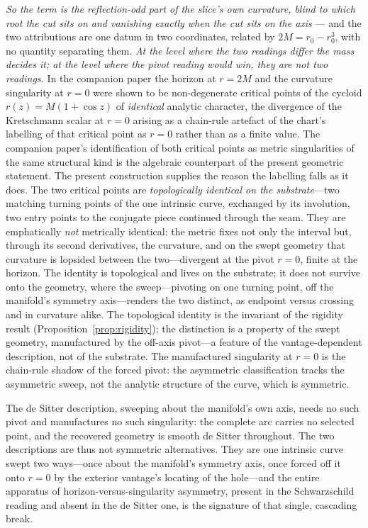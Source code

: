 \documentclass[11pt,a4paper]{article}
\theoremstyle{definition}
\begin{document}
\emph{So the term is the reflection-odd part of the slice's own curvature, blind to which root the cut sits
on and vanishing exactly when the cut sits on the axis} --- and the two attributions are one datum in two
coordinates, related by $2M=r_0-r_0^{3}$, with no quantity separating them. \emph{At the level where the two
readings differ the mass decides it; at the level where the pivot reading would win, they are not two
readings.} In the companion paper the horizon at $r=2M$ and the curvature singularity at $r=0$ were shown to be non-degenerate critical points of the cycloid $r(z)=M(1+\cos z)$ of \emph{identical} analytic character, the divergence of the Kretschmann scalar at $r=0$ arising as a chain-rule artefact of the chart's labelling of that critical point as $r=0$ rather than as a finite value. The companion paper's identification of both critical points as metric singularities of the same structural kind \cite{JanzenBHcausality,JanzenCircle} is the algebraic counterpart of the present geometric statement. The present construction supplies the reason the labelling falls as it does. The two critical points are \emph{topologically identical on the substrate}---two matching turning points of the one intrinsic curve, exchanged by its involution, two entry points to the conjugate piece continued through the seam. They are emphatically \emph{not} metrically identical: the metric fixes not only the interval but, through its second derivatives, the curvature, and on the swept geometry that curvature is lopsided between the two---divergent at the pivot $r=0$, finite at the horizon. The identity is topological and lives on the substrate; it does not survive onto the geometry, where the sweep---pivoting on one turning point, off the manifold's symmetry axis---renders the two distinct, as endpoint versus crossing and in curvature alike. The topological identity is the invariant of the rigidity result (Proposition~\ref{prop:rigidity}); the distinction is a property of the swept geometry, manufactured by the off-axis pivot---a feature of the vantage-dependent description, not of the substrate. The manufactured singularity at $r=0$ is the chain-rule shadow of the forced pivot: the asymmetric classification tracks the asymmetric sweep, not the analytic structure of the curve, which is symmetric.

The de Sitter description, sweeping about the manifold's own axis, needs no such pivot and manufactures no such singularity: the complete arc carries no selected point, and the recovered geometry is smooth de Sitter throughout. The two descriptions are thus not symmetric alternatives. They are one intrinsic curve swept two ways---once about the manifold's symmetry axis, once forced off it onto $r=0$ by the exterior vantage's locating of the hole---and the entire apparatus of horizon-versus-singularity asymmetry, present in the Schwarzschild reading and absent in the de Sitter one, is the signature of that single, cascading break.
\end{document}
